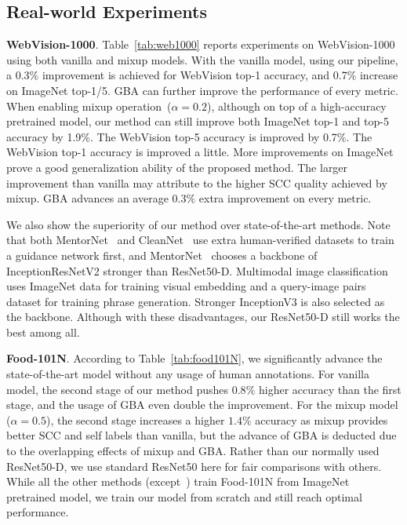 \documentclass[runningheads]{llncs}
\begin{document}
\subsection{Real-world Experiments}

\textbf{WebVision-1000}.
Table~\ref{tab:web1000} reports experiments on WebVision-1000 using both vanilla and mixup models.
With the vanilla model, using our pipeline, a 0.3\% improvement is achieved for WebVision top-1 accuracy, and 0.7\% increase on ImageNet top-1/5. 
GBA can further improve the performance of every metric.
When enabling mixup operation~($\alpha=0.2$), although on top of a high-accuracy pretrained model, our method can still improve both ImageNet top-1 and top-5 accuracy by 1.9\%. The WebVision top-5 accuracy is improved by 0.7\%. The WebVision top-1 accuracy is improved a little. More improvements on ImageNet prove a good generalization ability of the proposed method. The larger improvement than vanilla may attribute to the higher SCC quality achieved by mixup. GBA advances an average $0.3\%$ extra improvement on every metric.

We also show the superiority of our method over state-of-the-art methods. Note that both MentorNet~\cite{jiang2018mentornet} and CleanNet~ \cite{lee2018cleannet} use extra human-verified datasets to train a guidance network first, and MentorNet~\cite{jiang2018mentornet} chooses a backbone of InceptionResNetV2 stronger than ResNet50-D. Multimodal image classification~\cite{shah2019inferring} uses ImageNet data for training visual embedding and a query-image pairs dataset for training phrase generation. Stronger InceptionV3 is also selected as the backbone. Although with these disadvantages, our ResNet50-D still works the best among all.

\textbf{Food-101N}.
According to Table~\ref{tab:food101N}, we significantly advance the state-of-the-art model without any usage of human annotations.
For vanilla model, the second stage of our method pushes $0.8\%$ higher accuracy than the first stage, and the usage of GBA even double the improvement.
For the mixup model ($\alpha=0.5$), the second stage increases a higher $1.4\%$ accuracy as mixup provides better SCC and self labels than vanilla, but the advance of GBA is deducted due to the overlapping effects of mixup and GBA.
Rather than our normally used ResNet50-D, we use standard ResNet50 here for fair comparisons with others. While all the other methods (except~\cite{zhang2019metacleaner}) train Food-101N from ImageNet pretrained model, we train our model from scratch and still reach optimal performance.
\end{document}
